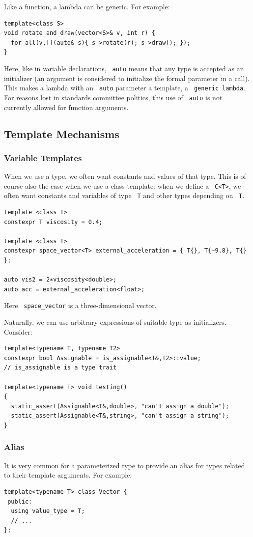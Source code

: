 \documentclass[11pt]{article}
\let\OldTexttt\texttt
\renewcommand{\texttt}[1]{\OldTexttt{\color{MidnightBlue} #1}}
\begin{document}
Like a function, a lambda can be generic. For example:
\begin{verbatim}
template<class S>
void rotate_and_draw(vector<S>& v, int r) {
  for_all(v,[](auto& s){ s−>rotate(r); s−>draw(); });
}
\end{verbatim}
Here, like in variable declarations, \texttt{auto} means that any type is accepted as an initializer (an
argument is considered to initialize the formal parameter in a call). This makes a lambda with
an \texttt{auto} parameter a template, a \texttt{generic lambda}. For reasons lost in standards committee
politics, this use of \texttt{auto} is not currently allowed for function arguments.
\subsection{Template Mechanisms}
\label{sec:org95b2b8c}
\subsubsection{Variable Templates}
\label{sec:org2f75b8b}
When we use a type, we often want constants and values of that type. This is of course also the
case when we use a class template: when we define a \texttt{C<T>}, we often want constants and variables
of type \texttt{T} and other types depending on \texttt{T}.

\begin{verbatim}
template <class T>
constexpr T viscosity = 0.4;

template <class T>
constexpr space_vector<T> external_acceleration = { T{}, T{−9.8}, T{} };

auto vis2 = 2∗viscosity<double>;
auto acc = external_acceleration<float>;
\end{verbatim}
Here \texttt{space\_vector} is a three-dimensional vector.

\label{Problem1}
Naturally, we can use arbitrary expressions of suitable type as initializers. Consider:
\begin{verbatim}
template<typename T, typename T2>
constexpr bool Assignable = is_assignable<T&,T2>::value;
// is_assignable is a type trait 

template<typename T> void testing()
{
  static_assert(Assignable<T&,double>, "can't assign a double");
  static_assert(Assignable<T&,string>, "can't assign a string");
}
\end{verbatim}
\subsubsection{Alias}
\label{sec:org10fdd60}
It is very common for a parameterized type to provide an alias for types related to their
template arguments. For example:
\begin{verbatim}
template<typename T> class Vector {
 public:
  using value_type = T;
  // ...
};
\end{verbatim}
\end{document}
